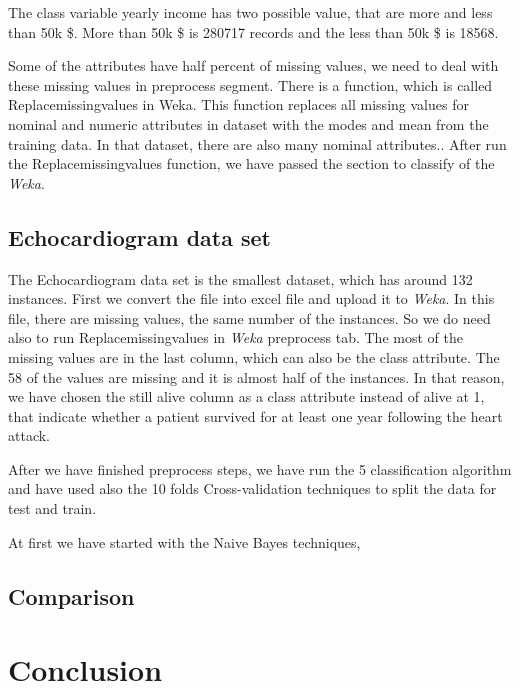 \documentclass[a4paper]{article}
\begin{document}
The class variable yearly income has two possible value, that are more and less than 50k \$. More than 50k \$ is 280717 records and the less than 50k \$ is 18568. 

Some of the attributes have half percent of missing values, we need to deal with these missing values in preprocess segment. There is a function, which is called Replacemissingvalues in Weka. This function replaces all missing values for nominal and numeric attributes in dataset with the modes and mean from the training data. In that dataset, there are also many nominal attributes.. After run the Replacemissingvalues function, we have passed the section to classify of the \emph{Weka}. 












\subsection{Echocardiogram data set}

The Echocardiogram data set is the smallest dataset, which has around 132 instances. First we convert the file into excel file and upload it to \emph{Weka}. In this file, there are missing values, the same number of the instances. So we do need also to run Replacemissingvalues in \emph{Weka} preprocess tab. The most of the missing values are in the last column, which can also be the class attribute. The 58 of the values are missing and it is almost half of the instances. In that reason, we have chosen the still alive column as a class attribute instead of alive at 1, that indicate whether a patient survived for at least one year following the heart attack. 

After we have finished preprocess steps, we have run the 5 classification algorithm and have used also the 10 folds Cross-validation techniques to split the data for test and train. 

At first we have started with the Naive Bayes techniques,







\subsection{Comparison}

\section{Conclusion}
\end{document}
